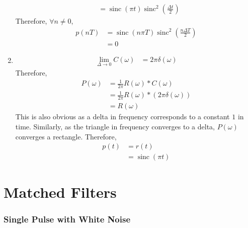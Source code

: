 \documentclass[titlepage, fleqn, a4paper, 12pt, twoside]{article}
\theoremstyle{definition}
\theoremstyle{theorem}
\DeclareMathOperator{\sinc}{\mathrm{sinc}}
\begin{document}
\begin{solution}
\begin{enumerate}
\begin{align*}
				&= \sinc(\pi t) \sinc^2\left( \frac{\Delta t}{2} \right)
			\end{align*}
			Therefore, $\forall n \neq 0$,
			\begin{align*}
				p(n T) &= \sinc(n \pi T) \sinc^2\left( \frac{n \Delta T}{2} \right)\\
				&= 0
			\end{align*}
		\item
			\begin{align*}
				\lim\limits_{\Delta \to 0} C(\omega) &= 2 \pi \delta(\omega)
			\end{align*}
			Therefore,
			\begin{align*}
				P(\omega) &= \frac{1}{2 \pi} R(\omega) \ast C(\omega)\\
				&= \frac{1}{2 \pi} R(\omega) \ast \left( 2 \pi \delta(\omega) \right)\\
				&= R(\omega)
			\end{align*}
			This is also obvious as a delta in frequency corresponds to a constant $1$ in time.
			Similarly, as the triangle in frequency converges to a delta, $P(\omega)$ converges a rectangle.
			Therefore,
			\begin{align*}
				p(t) &= r(t)\\
				&= \sinc(\pi t)
			\end{align*}
	\end{enumerate}
\end{solution}

\clearpage
\part{Matched Filters}

\section{Single Pulse with White Noise}
\end{document}
